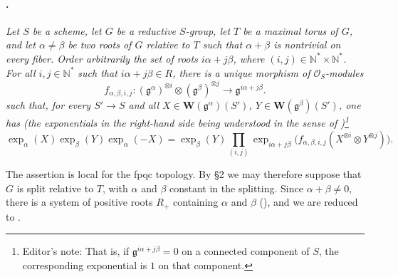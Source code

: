 \paragraph{.}
\textit{Let \(S\) be a scheme, let \(G\) be a reductive
\(S\)-group, let \(T\) be a maximal torus of \(G\), and let
\(\alpha\ne\beta\) be two roots of \(G\) relative to \(T\) such
that \(\alpha+\beta\) is nontrivial on every fiber. Order
arbitrarily the set of roots \(i\alpha+j\beta\), where
\((i,j)\in\mathbb N^*\times\mathbb N^*\). For all
\(i,j\in\mathbb N^*\) such that \(i\alpha+j\beta\in R\), there is
a unique morphism of \(\mathcal O_S\)-modules}
\[
  f_{\alpha,\beta,i,j}:
  (\mathfrak g^\alpha)^{\otimes i}
  \otimes
  (\mathfrak g^\beta)^{\otimes j}
  \longrightarrow
  \mathfrak g^{i\alpha+j\beta}.
\]
\textit{such that, for every \(S'\to S\) and all
\(X\in\mathbf W(\mathfrak g^\alpha)(S')\),
\(Y\in\mathbf W(\mathfrak g^\beta)(S')\), one has
\textup{(the exponentials in the right-hand side being understood
in the sense of )}\footnote{Editor's note: That is, if
\(\mathfrak g^{i\alpha+j\beta}=0\) on a connected component of
\(S\), the corresponding exponential is \(1\) on that component.}}
\[
  \exp_\alpha(X)\exp_\beta(Y)\exp_\alpha(-X)
  =
  \exp_\beta(Y)
  \prod_{(i,j)}
    \exp_{i\alpha+j\beta}
      \bigl(f_{\alpha,\beta,i,j}(X^{\otimes i}\otimes
      Y^{\otimes j})\bigr).
\]

The assertion is local for the fpqc topology. By \S2 we may
therefore suppose that \(G\) is split relative to \(T\), with
\(\alpha\) and \(\beta\) constant in the splitting. Since
\(\alpha+\beta\ne0\), there is a system of positive roots \(R_+\)
containing \(\alpha\) and \(\beta\) \textup{()},
and we are reduced to .

